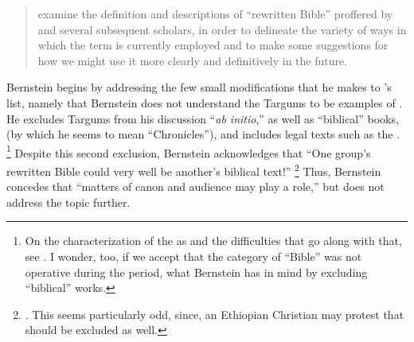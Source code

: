 \begin{quote}
    examine the definition and descriptions of ``rewritten Bible'' proffered by \vermes and several subsequent scholars, in order to delineate the variety of ways in which the term is currently employed and to make some suggestions for how we might use it more clearly and definitively in the future.%
    \autocite[171--172]{bernstein_textus2005}
\end{quote}
\noindent
Bernstein begins by addressing the few small modifications that he makes to \vermes's list, namely that Bernstein does not understand the Targums to be examples of \rwb. He excludes Targums from his discussion ``\emph{ab initio},'' as well as ``biblical'' books, (by which he seems to mean ``Chronicles''), and includes legal texts such as the \templescroll.%
    \footnote{%
        On the characterization of the \templescroll as \rwb and the difficulties that go along with that, see 
        \cite{fraade_goldstein-etal2017}. 
        I wonder, too, if we accept that the category of ``Bible'' was not operative during the \secondtemple period, what Bernstein has in mind by excluding ``biblical'' works.}
Despite this second exclusion, Bernstein acknowledges that ``One group's rewritten Bible could very well be another's biblical text!''%
    \footnote{%
        \Cite[175]{bernstein_textus2005}.
        This seems particularly odd, since, an Ethiopian Christian may protest that \jub should be excluded as well.}
Thus, Bernstein concedes that ``matters of canon and audience may play a role,'' but does not address the topic further. 

